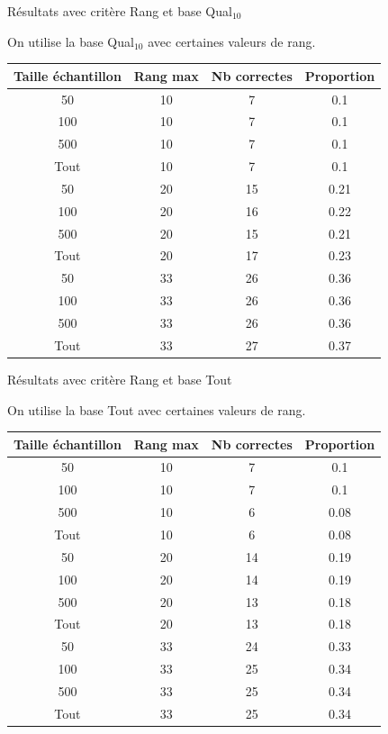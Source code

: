 \documentclass{beamer}
\begin{document}
\begin{frame}{Résultats avec critère Rang et base Qual$_{10}$}

On utilise la base Qual$_{10}$ avec certaines valeurs de rang.
\begin{tabular}{|c|c|c|c|}
   \hline
   Taille échantillon & Rang max & Nb correctes & Proportion\\
   \hline
   50 & 10  & 7 & 0.1  \\
   \hline
   100 & 10  & 7 & 0.1  \\
   \hline
   500 & 10  & 7 & 0.1  \\
   \hline
   Tout & 10 & 7 & 0.1 \\
   \hline
   50 & 20  & 15 & 0.21  \\
   \hline
   100 & 20 & 16 & 0.22  \\
   \hline
   500 & 20 & 15 & 0.21  \\
   \hline
   Tout & 20 & 17 & 0.23 \\
   \hline
   50 & 33 & 26 & 0.36  \\
   \hline
   100 & 33 & 26 & 0.36  \\
   \hline
   500 & 33 & 26 & 0.36  \\
   \hline
   Tout & 33 & 27 & 0.37 \\
   \hline
\end{tabular}
\end{frame}

\begin{frame}{Résultats avec critère Rang et base Tout}

On utilise la base Tout avec certaines valeurs de rang.
\begin{tabular}{|c|c|c|c|}
   \hline
   Taille échantillon & Rang max & Nb correctes & Proportion\\
   \hline
   50 & 10  & 7 & 0.1  \\
   \hline
   100 & 10  & 7 & 0.1  \\
   \hline
   500 & 10  & 6 & 0.08  \\
   \hline
   Tout & 10 & 6 & 0.08 \\
   \hline
   50 & 20  & 14 & 0.19  \\
   \hline
   100 & 20 & 14 & 0.19  \\
   \hline
   500 & 20 & 13 & 0.18  \\
   \hline
   Tout & 20 & 13 & 0.18 \\
   \hline
   50 & 33 & 24 & 0.33  \\
   \hline
   100 & 33 & 25 & 0.34  \\
   \hline
   500 & 33 & 25 & 0.34  \\
   \hline
   Tout & 33 & 25 & 0.34 \\
   \hline
\end{tabular}
\end{frame}
\end{document}
